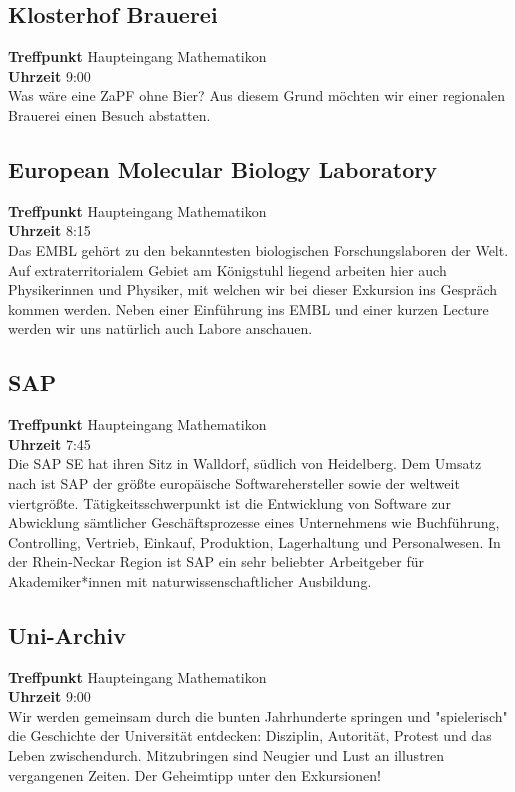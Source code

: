 \subsection*{Klosterhof Brauerei}
\textbf{Treffpunkt} Haupteingang Mathematikon\\
\textbf{Uhrzeit} 9:00\\
Was wäre eine ZaPF ohne Bier? Aus diesem Grund möchten wir einer regionalen Brauerei einen Besuch abstatten. 

\subsection*{European Molecular Biology Laboratory}
\textbf{Treffpunkt} Haupteingang Mathematikon \\
\textbf{Uhrzeit} 8:15\\
Das EMBL gehört zu den bekanntesten biologischen Forschungslaboren der Welt. Auf extraterritorialem Gebiet am Königstuhl liegend arbeiten hier auch Physikerinnen und Physiker, mit welchen wir bei dieser Exkursion ins Gespräch kommen werden. Neben einer Einführung ins EMBL und einer kurzen \flqq Lecture \frqq werden wir uns natürlich auch Labore anschauen.

\subsection*{SAP}
\textbf{Treffpunkt} Haupteingang Mathematikon\\
\textbf{Uhrzeit} 7:45\\
Die SAP SE hat ihren Sitz in Walldorf, südlich von Heidelberg. Dem Umsatz nach ist SAP der größte europäische Softwarehersteller sowie der weltweit viertgrößte. Tätigkeitsschwerpunkt ist die Entwicklung von Software zur Abwicklung sämtlicher Geschäftsprozesse eines Unternehmens wie Buchführung, Controlling, Vertrieb, Einkauf, Produktion, Lagerhaltung und Personalwesen. In der Rhein-Neckar Region ist SAP ein sehr beliebter Arbeitgeber für Akademiker*innen mit naturwissenschaftlicher Ausbildung. 

\subsection*{Uni-Archiv}
\textbf{Treffpunkt} Haupteingang Mathematikon\\
\textbf{Uhrzeit} 9:00\\
Wir werden gemeinsam durch die bunten Jahrhunderte springen und "spielerisch" die Geschichte der Universität entdecken: Disziplin, Autorität, Protest und das Leben zwischendurch. Mitzubringen sind Neugier und Lust an illustren vergangenen Zeiten. Der Geheimtipp unter den Exkursionen! 

